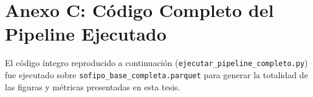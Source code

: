 \chapter*{Anexo C: Código Completo del Pipeline Ejecutado}

El código íntegro reproducido a continuación (\texttt{ejecutar\_pipeline\_completo.py}) fue ejecutado sobre \texttt{sofipo\_base\_completa.parquet} para generar la totalidad de las figuras y métricas presentadas en esta tesis.



